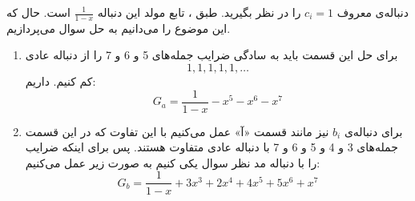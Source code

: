     \p
    دنباله‌ی معروف 
    $c_i = 1$
    را در نظر بگیرید. طبق
    ،
    تابع مولد این دنباله
    $\frac{1}{1-x}$
    است.
حال که این موضوع را می‌دانیم به حل سوال می‌پردازیم.
\begin{enumerate}
    \item 
            برای حل این قسمت باید به سادگی ضرایب جمله‌های 5 و 6 و 7 را از دنباله عادی
            $${1,1,1,1,1,\ldots}$$
            کم کنیم. داریم:
            $$G_{a} = \frac{1}{1-x} - x^5 - x^6 - x^7$$
    \item
            برای دنباله‌ی 
            $b_i$
              نیز مانند قسمت «آ» عمل می‌کنیم با این تفاوت که در این قسمت جمله‌های 3 و 4 و 5 و 6 و 7 با دنباله عادی متفاوت هستند. پس برای اینکه ضرایب را با دنباله مد نظر سوال یکی کنیم به صورت زیر عمل می‌کنیم:
            $$G_{b} = \frac{1}{1-x} + 3x^3 + 2x^4 + 4x^5 + 5x^6 + x^7$$
      
\end{enumerate}